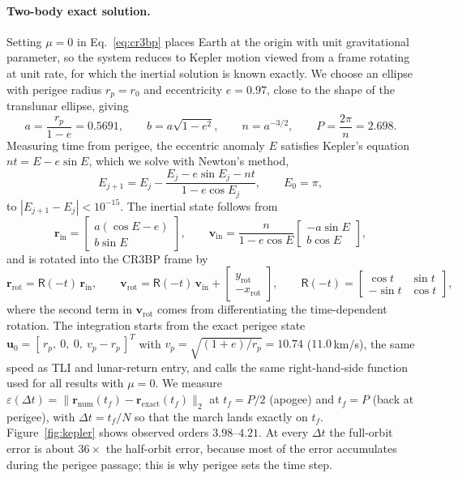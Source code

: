 \documentclass[11pt]{article}
\newcommand{\bu}{\mathbf{u}}
\begin{document}
\paragraph{Two-body exact solution.} Setting $\mu = 0$ in Eq.~\eqref{eq:cr3bp} places Earth at the origin with unit gravitational parameter, so the system reduces to Kepler motion viewed from a frame rotating at unit rate, for which the inertial solution is known exactly. We choose an ellipse with perigee radius $r_p = r_0$ and eccentricity $e = 0.97$, close to the shape of the translunar ellipse, giving
\begin{equation}
a = \frac{r_p}{1-e} = 0.5691, \qquad b = a\sqrt{1-e^2}, \qquad n = a^{-3/2}, \qquad P = \frac{2\pi}{n} = 2.698 .
\end{equation}
Measuring time from perigee, the eccentric anomaly $E$ satisfies Kepler's equation $nt = E - e\sin E$, which we solve with Newton's method,
\begin{equation}
E_{j+1} = E_j - \frac{E_j - e\sin E_j - nt}{1 - e\cos E_j}, \qquad E_0 = \pi,
\end{equation}
to $|E_{j+1}-E_j| < 10^{-15}$. The inertial state follows from
\begin{equation}
\mathbf{r}_{\mathrm{in}} = \begin{bmatrix} a(\cos E - e) \\ b\sin E \end{bmatrix}, \qquad
\mathbf{v}_{\mathrm{in}} = \frac{n}{1 - e\cos E}\begin{bmatrix} -a\sin E \\ b\cos E \end{bmatrix},
\end{equation}
and is rotated into the CR3BP frame by
\begin{equation}
\mathbf{r}_{\mathrm{rot}} = \mathsf{R}(-t)\,\mathbf{r}_{\mathrm{in}}, \qquad
\mathbf{v}_{\mathrm{rot}} = \mathsf{R}(-t)\,\mathbf{v}_{\mathrm{in}} + \begin{bmatrix} y_{\mathrm{rot}} \\ -x_{\mathrm{rot}} \end{bmatrix}, \qquad
\mathsf{R}(-t) = \begin{bmatrix} \cos t & \sin t \\ -\sin t & \cos t \end{bmatrix},
\end{equation}
where the second term in $\mathbf{v}_{\mathrm{rot}}$ comes from differentiating the time-dependent rotation. The integration starts from the exact perigee state $\bu_0 = [\,r_p,\ 0,\ 0,\ v_p - r_p\,]^T$ with $v_p = \sqrt{(1+e)/r_p} = 10.74$ ($11.0$\,km/s), the same speed as TLI and lunar-return entry, and calls the same right-hand-side function used for all results with $\mu = 0$. We measure $\varepsilon(\Delta t) = \|\mathbf{r}_{\mathrm{num}}(t_f) - \mathbf{r}_{\mathrm{exact}}(t_f)\|_2$ at $t_f = P/2$ (apogee) and $t_f = P$ (back at perigee), with $\Delta t = t_f/N$ so that the march lands exactly on $t_f$. Figure~\ref{fig:kepler} shows observed orders $3.98$--$4.21$. At every $\Delta t$ the full-orbit error is about $36\times$ the half-orbit error, because most of the error accumulates during the perigee passage; this is why perigee sets the time step.
\end{document}
